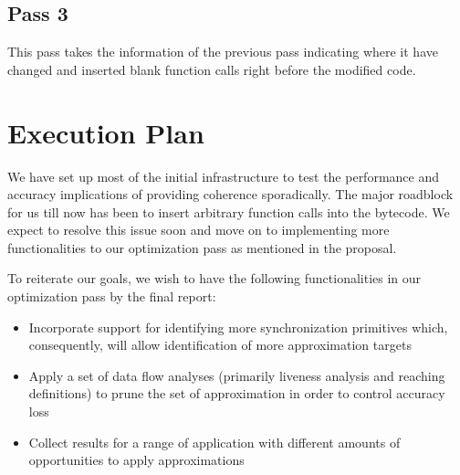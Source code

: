 \documentclass[12pt,conference]{IEEEtran}
\begin{document}
\subsection{Pass 3}

This pass takes the information of the previous pass indicating where it have changed and inserted blank function calls right before the modified code.

\section{Execution Plan}

We have set up most of the initial infrastructure to test the performance and 
accuracy implications of providing coherence sporadically. The major roadblock
for us till now has been to insert arbitrary function calls into the bytecode.
We expect to resolve this issue soon and move on to implementing more 
functionalities to our optimization pass as mentioned in the proposal.

To reiterate our goals, we wish to have the following functionalities in
our optimization pass by the final report:
\begin{itemize}
\item Incorporate support for identifying more synchronization primitives
which, consequently, will allow identification of more approximation targets
\item Apply a set of data flow analyses (primarily liveness analysis and 
reaching definitions) to prune the set of approximation in order to control
accuracy loss
\item Collect results for a range of application with different amounts of 
opportunities to apply approximations
\end{itemize}
\end{document}
